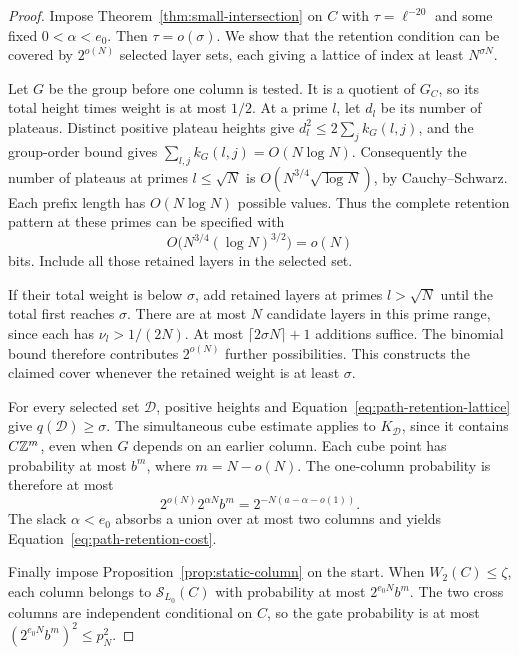\begin{proof}
Impose Theorem~\ref{thm:small-intersection} on \(C\) with
\(\tau=\ell^{-20}\) and some fixed \(0<\alpha<e_0\).
Then \(\tau=o(\sigma)\). We show that the retention condition can be
covered by \(2^{o(N)}\) selected layer sets, each giving a lattice of
index at least \(N^{\sigma N}\).

Let \(G\) be the group before one column is tested. It is a quotient
of \(G_C\), so its total height times weight is at most \(1/2\).
At a prime \(l\), let \(d_l\) be its number of plateaus. Distinct
positive plateau heights give
\(d_l^2\le2\sum_j k_G(l,j)\), and the group-order bound gives
\(\sum_{l,j}k_G(l,j)=O(N\log N)\). Consequently the number of
plateaus at primes \(l\le\sqrt N\) is
\(O(N^{3/4}\sqrt{\log N})\), by Cauchy--Schwarz. Each prefix
length has \(O(N\log N)\) possible values. Thus the complete
retention pattern at these primes can be specified with
\begin{equation}\label{eq:path-small-prime-entropy}
 O\bigl(N^{3/4}(\log N)^{3/2}\bigr)=o(N)
\end{equation}
bits. Include all those retained layers in the selected set.

If their total weight is below \(\sigma\), add retained layers at
primes \(l>\sqrt N\) until the total first reaches \(\sigma\).
There are at most \(N\) candidate layers in this prime range, since
each has \(\nu_l>1/(2N)\). At most
\(\lceil2\sigma N\rceil+1\) additions suffice. The binomial bound
therefore contributes \(2^{o(N)}\) further possibilities. This
constructs the claimed cover whenever the retained weight is at
least \(\sigma\).

For every selected set \(\mathcal D\), positive heights and
Equation~\eqref{eq:path-retention-lattice} give
\(q(\mathcal D)\ge\sigma\). The simultaneous cube estimate applies
to \(K_{\mathcal D}\), since it contains \(C\mathbb Z^m\), even when
\(G\) depends on an earlier column. Each cube point has probability
at most \(b^m\), where \(m=N-o(N)\). The one-column probability is
therefore at most
\[
 2^{o(N)}2^{\alpha N}b^m
       =2^{-N(a-\alpha-o(1))}.
\]
The slack \(\alpha<e_0\) absorbs a union over at most two columns
and yields Equation~\eqref{eq:path-retention-cost}.

Finally impose Proposition~\ref{prop:static-column} on the start.
When \(W_2(C)\le\zeta\), each column belongs to
\(\mathcal S_{L_0}(C)\) with probability at most \(2^{e_0N}b^m\).
The two cross columns are independent conditional on \(C\), so the
gate probability is at most
\((2^{e_0N}b^m)^2\le p_N^2\).
\end{proof}

